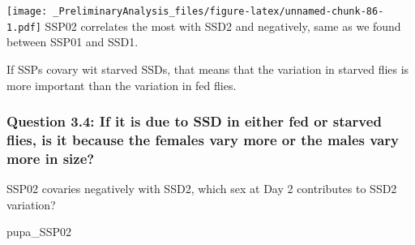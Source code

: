 \documentclass[
]{article}
\newenvironment{Shaded}{\begin{snugshade}}{\end{snugshade}}
\newcommand{\NormalTok}[1]{#1}
\begin{document}
\texttt{[image: \_PreliminaryAnalysis\_files/figure-latex/unnamed-chunk-86-1.pdf]}
SSP02 correlates the most with SSD2 and negatively, same as we found
between SSP01 and SSD1.

If SSPs covary wit starved SSDs, that means that the variation in
starved flies is more important than the variation in fed flies.

\hypertarget{question-3.4-if-it-is-due-to-ssd-in-either-fed-or-starved-flies-is-it-because-the-females-vary-more-or-the-males-vary-more-in-size}{%
\subsubsection{Question 3.4: If it is due to SSD in either fed or
starved flies, is it because the females vary more or the males vary
more in
size?}\label{question-3.4-if-it-is-due-to-ssd-in-either-fed-or-starved-flies-is-it-because-the-females-vary-more-or-the-males-vary-more-in-size}}

SSP02 covaries negatively with SSD2, which sex at Day 2 contributes to
SSD2 variation?

\begin{Shaded}
\begin{Highlighting}[]
\NormalTok{pupa_SSP02}
\end{Highlighting}
\end{Shaded}
\end{document}
